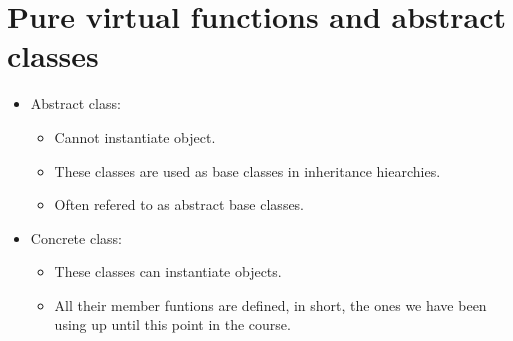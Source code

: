 \section{Pure virtual functions and abstract classes}
\begin{itemize}
    \item Abstract class:
        \begin{itemize}
            \item Cannot instantiate object.
            \item These classes are used as base classes in inheritance hiearchies.
            \item Often refered to as abstract base classes.
        \end{itemize}
    
    \item Concrete class:
        \begin{itemize}
            \item These classes can instantiate objects.
            \item All their member funtions are defined, in short, the ones we have been using up until this point in the course.
        \end{itemize}
\end{itemize}

